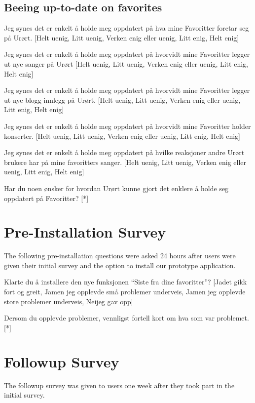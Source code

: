 \subsection{Beeing up-to-date on favorites}

\begin{enum}
  \item Jeg synes det er enkelt å holde meg oppdatert på
    hva mine Favoritter foretar seg på Urørt.
    [Helt uenig, Litt uenig, Verken enig eller uenig, Litt enig, Helt enig]
  \item Jeg synes det er enkelt å holde meg oppdatert på
    hvorvidt mine Favoritter legger ut nye sanger på Urørt
    [Helt uenig, Litt uenig, Verken enig eller uenig, Litt enig, Helt enig]
  \item Jeg synes det er enkelt å holde meg oppdatert på
    hvorvidt mine Favoritter legger ut nye blogg innlegg på Urørt.
    [Helt uenig, Litt uenig, Verken enig eller uenig, Litt enig, Helt enig]
  \item Jeg synes det er enkelt å holde meg oppdatert på
    hvorvidt mine Favoritter holder konserter.
    [Helt uenig, Litt uenig, Verken enig eller uenig, Litt enig, Helt enig]
  \item Jeg synes det er enkelt å holde meg oppdatert på
    hvilke reaksjoner andre Urørt brukere har på mine favoritters sanger.
    [Helt uenig, Litt uenig, Verken enig eller uenig, Litt enig, Helt enig]
  \item Har du noen ønsker for hvordan Urørt kunne gjort det enklere å holde
    seg oppdatert på Favoritter? [*]
\end{enum}


\section{Pre-Installation Survey}

The following pre-installation questions were asked 24 hours after users were
given their initial survey and the option to install our prototype
application.

\begin{enum}
  \item * Klarte du å installere den nye funksjonen ``Siste fra dine
    favoritter''?
    [Ja\dash{}det gikk fort og greit,
    Ja\dash{}men jeg opplevde små problemer underveis,
    Ja\dash{}men jeg opplevde store problemer underveis,
    Nei\dash{}jeg gav opp]
  \item Dersom du opplevde problemer, vennligst fortell kort om hva som var
  problemet. [*]
\end{enum}

\section{Followup Survey}

The followup survey was given to users one week after they took part in the
initial survey.
